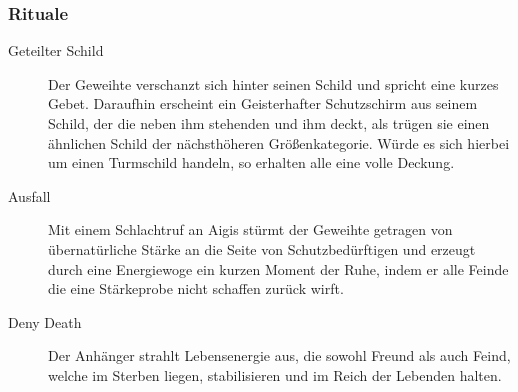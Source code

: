 \documentclass[a4paper,12pt,oneside]{book}
\begin{document}
\subsubsection{Rituale}
\begin{description}
\item[Geteilter Schild]
Der Geweihte verschanzt sich hinter seinen Schild und spricht eine kurzes Gebet. Daraufhin erscheint ein Geisterhafter Schutzschirm aus seinem Schild, der die neben ihm stehenden und ihm deckt, als trügen sie einen ähnlichen Schild der nächsthöheren Größenkategorie. Würde es sich hierbei um einen Turmschild handeln, so erhalten alle eine volle Deckung. 
\item[Ausfall]
Mit einem Schlachtruf an Aigis stürmt der Geweihte getragen von übernatürliche Stärke an die Seite von Schutzbedürftigen und erzeugt durch eine Energiewoge ein kurzen Moment der Ruhe, indem er alle Feinde die eine Stärkeprobe nicht schaffen zurück wirft.
\item[Deny Death] Der Anhänger strahlt Lebensenergie aus, die sowohl Freund als auch Feind, welche im Sterben liegen, stabilisieren und im Reich der Lebenden halten.
\end{description}
\end{document}
